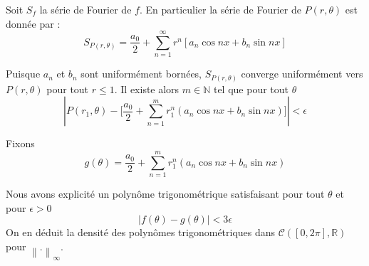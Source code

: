 \documentclass[
	10pt, %
]{beamer}
\begin{document}
\begin{frame}
	Soit \( S_f \) la série de Fourier de \( f \). En particulier la série de Fourier de \( P(r,\theta) \) est donnée par :
	\[
		S_{P(r,\theta)} = \frac{a_0}{2} + 
		\sum_{n=1}^{\infty} r^{n} \left[ a_n \cos nx + b_n \sin nx \right]
	\]

	Puisque \( a_n \) et \( b_n \) sont uniformément bornées, \( S_{P(r,\theta)} \) converge uniformément vers \( P(r,\theta) \) pour tout \( r \le 1 \). Il existe alors \( m \in \mathbb{N} \) tel que pour tout \( \theta \) 
	\begin{equation*}
		{\left\lvert P(r_1,\theta) - 
		\lbrack \frac{a_0}{2} + \sum_{n=1}^{m} r_1^{n}(a_n \cos nx + b_n \sin nx) \rbrack \right\rvert} < \epsilon
	\end{equation*}

	Fixons
	\begin{equation*}
		g(\theta) = \frac{a_0}{2} + \sum_{n=1}^{m} r_1^{n}(a_n \cos nx + b_n \sin nx) 
	\end{equation*}

	Nous avons explicité un polynôme trigonométrique satisfaisant pour tout \( \theta \) et pour \( \epsilon > 0 \)
	\begin{equation*}
		{\left\lvert f(\theta) - g(\theta) \right\rvert} < 3\epsilon
	\end{equation*}
	On en déduit la densité des polynômes trigonométriques dans \( \mathcal{C}([0,2\pi],\mathbb{R}) \) pour \( {\left\lVert . \right\rVert}_{\infty} \).
\end{frame}
\end{document}
